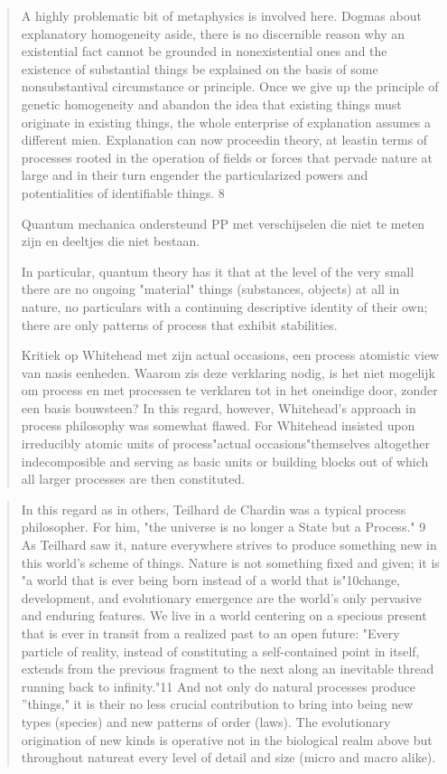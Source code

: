 \documentclass[a4paper]{Thesis}
\begin{document}
\begin{quotation}
		A highly problematic bit of
		metaphysics is involved here. Dogmas about explanatory homogeneity aside, there is no
		discernible reason why an existential fact cannot be grounded in nonexistential ones and
		the existence of substantial things be explained on the basis of some nonsubstantival
		circumstance or principle. Once we give up the principle of genetic homogeneity and
		abandon the idea that existing things must originate in existing things, the whole
		enterprise of explanation assumes a different mien. Explanation can now proceedin
		theory, at leastin terms of
		processes rooted in the operation of fields or forces that pervade nature at large and in
		their turn engender the particularized powers and potentialities of identifiable things. 8
		
		Quantum mechanica ondersteund PP met verschijselen die niet te meten zijn en deeltjes die niet bestaan.
		
		In particular,
		quantum theory has it that at the level of the very small there are no ongoing "material"
		things (substances, objects) at all in nature, no particulars with a continuing descriptive
		identity of their own; there are only patterns of process that exhibit stabilities.
		
		Kritiek op Whitehead met zijn actual occasions, een process atomistic view van nasis eenheden. Waarom zis deze verklaring nodig, is het niet mogelijk om process en met processen te verklaren tot in het oneindige door, zonder een basis bouwsteen? 
		In this regard, however, Whitehead's approach in process philosophy was somewhat
		flawed. For Whitehead insisted upon irreducibly atomic units of process"actual
		occasions"themselves altogether indecomposible and serving as basic units or building
		blocks out of which all larger processes are then constituted.
		
	\end{quotation}
	
	\begin{quotation}
		In this regard as in others, Teilhard de Chardin was a typical process philosopher. For
		him, "the universe is no longer a State but a Process." 9 As Teilhard saw it, nature
		everywhere strives to produce something new in this world's scheme of things. Nature is
		not something fixed and given; it is "a world that is ever being born instead of a world
		that is"10change, development, and evolutionary emergence are the world's only
		pervasive and enduring features. We live in a world centering on a specious present that
		is ever in transit from a realized past to an open future: "Every particle of reality, instead
		of constituting a self-contained point in itself, extends from the previous fragment to the
		next along an inevitable thread running back to infinity."11 And not only do natural
		processes produce ''things," it is their no less crucial contribution to bring into being new
		types (species) and new patterns of order (laws). The evolutionary origination of new
		kinds is operative not in the biological realm above but throughout natureat every level of
		detail and size (micro and macro alike).
	\end{quotation}
	
\end{document}
